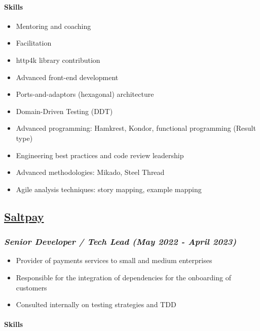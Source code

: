 \paragraph{Skills}\label{skills-springernature-2023}

\begin{itemize}
\tightlist
\item
  Mentoring and coaching
\item
  Facilitation
\item
  http4k library contribution
\item
  Advanced front-end development
\item
  Ports-and-adaptors (hexagonal) architecture
\item
  Domain-Driven Testing (DDT)
\item
  Advanced programming: Hamkrest, Kondor, functional programming (Result
  type)
\item
  Engineering best practices and code review leadership
\item
  Advanced methodologies: Mikado, Steel Thread
\item
  Agile analysis techniques: story mapping, example mapping
\end{itemize}

\subsection{\texorpdfstring{\href{https://www.saltpay.co/}{Saltpay}}{Saltpay}}\label{saltpay}

\subsubsection{\texorpdfstring{\emph{Senior Developer / Tech Lead (May
2022 - April
2023)}}{Senior Developer / Tech Lead (May 2022 - April 2023)}}\label{saltpay-role}

\begin{itemize}
\tightlist
\item
  Provider of payments services to small and medium enterprises
\item
  Responsible for the integration of dependencies for the onboarding of
  customers
\item
  Consulted internally on testing strategies and TDD
\end{itemize}

\paragraph{Skills}\label{skills-saltpay}

